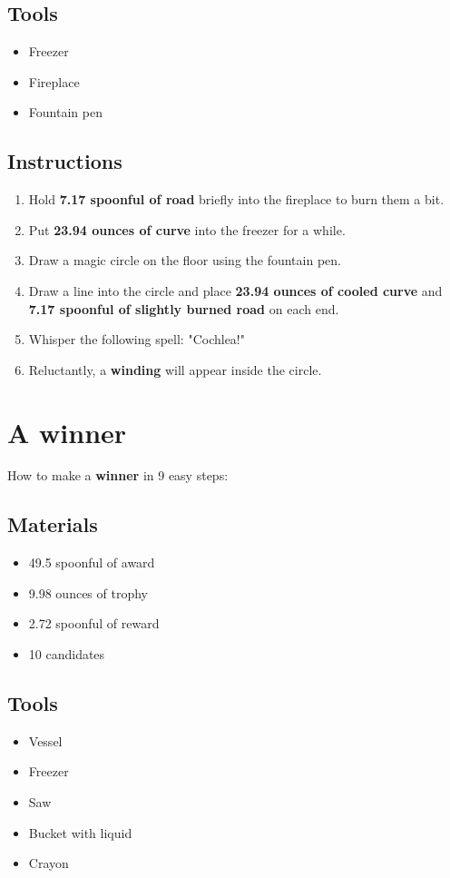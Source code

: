 \documentclass{article}
\begin{document}
\subsection{Tools}\begin{itemize}
\item 
Freezer
\item 
Fireplace
\item 
Fountain pen
\end{itemize}
\subsection{Instructions}\begin{enumerate}
\item 
Hold \textbf{7.17 spoonful of road} briefly into the fireplace to burn them a bit.
\item 
Put \textbf{23.94 ounces of curve} into the freezer for a while.
\item 
Draw a magic circle on the floor using the fountain pen.
\item 
Draw a line into the circle and place \textbf{23.94 ounces of cooled curve} and \textbf{7.17 spoonful of slightly burned road} on each end.
\item 
Whisper the following spell: "Cochlea!"
\item 
Reluctantly, a \textbf{winding} will appear inside the circle.
\end{enumerate}
\newpage
\section{A winner}How to make a \textbf{winner} in 9 easy steps:

\subsection{Materials}\begin{itemize}
\item 
49.5 spoonful of award
\item 
9.98 ounces of trophy
\item 
2.72 spoonful of reward
\item 
10 candidates
\end{itemize}
\subsection{Tools}\begin{itemize}
\item 
Vessel
\item 
Freezer
\item 
Saw
\item 
Bucket with liquid
\item 
Crayon
\end{itemize}
\end{document}
